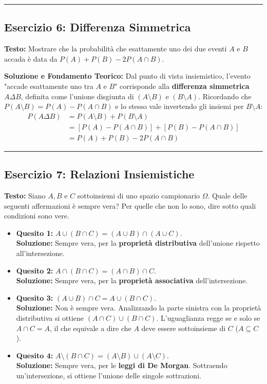 \documentclass[12pt, a4paper]{article}
\begin{document}
\vspace{0.5cm}\hrule\vspace{0.5cm}

\subsection*{Esercizio 6: Differenza Simmetrica}
\textbf{Testo:} Mostrare che la probabilità che esattamente uno dei due eventi $A$ e $B$ accada è data da $P(A)+P(B)-2P(A \cap B)$.

\textbf{Soluzione e Fondamento Teorico:} 
Dal punto di vista insiemistico, l'evento "accade esattamente uno tra $A$ e $B$" corrisponde alla \textbf{differenza simmetrica} $A \Delta B$, definita come l'unione disgiunta di $(A \setminus B)$ e $(B \setminus A)$.
Ricordando che $P(A \setminus B) = P(A) - P(A \cap B)$ e lo stesso vale invertendo gli insiemi per $B \setminus A$:
\begin{align*}
P(A \Delta B) &= P(A \setminus B) + P(B \setminus A) \\
&= [P(A) - P(A \cap B)] + [P(B) - P(A \cap B)] \\
&= P(A) + P(B) - 2P(A \cap B)
\end{align*}

\vspace{0.5cm}\hrule\vspace{0.5cm}

\subsection*{Esercizio 7: Relazioni Insiemistiche}
\textbf{Testo:} Siano $A, B$ e $C$ sottoinsiemi di uno spazio campionario $\Omega$. Quale delle seguenti affermazioni è sempre vera? Per quelle che non lo sono, dire sotto quali condizioni sono vere.

\begin{itemize}
    \item \textbf{Quesito 1:} $A \cup (B \cap C) = (A \cup B) \cap (A \cup C)$. \\ \textbf{Soluzione:} Sempre vera, per la \textbf{proprietà distributiva} dell'unione rispetto all'intersezione.
    \item \textbf{Quesito 2:} $A \cap (B \cap C) = (A \cap B) \cap C$. \\ \textbf{Soluzione:} Sempre vera, per la \textbf{proprietà associativa} dell'intersezione.
    \item \textbf{Quesito 3:} $(A \cup B) \cap C = A \cup (B \cap C)$. \\ \textbf{Soluzione:} Non è sempre vera. Analizzando la parte sinistra con la proprietà distributiva si ottiene $(A \cap C) \cup (B \cap C)$. L'uguaglianza regge se e solo se $A \cap C = A$, il che equivale a dire che $A$ deve essere sottoinsieme di $C$ ($A \subseteq C$).
    \item \textbf{Quesito 4:} $A \setminus (B \cap C) = (A \setminus B) \cup (A \setminus C)$. \\ \textbf{Soluzione:} Sempre vera, per le \textbf{leggi di De Morgan}. Sottraendo un'intersezione, si ottiene l'unione delle singole sottrazioni.
\end{itemize}
\end{document}
